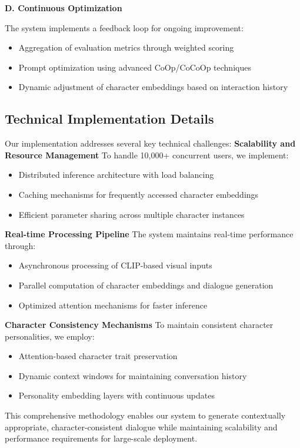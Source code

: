 \documentclass{article}
\begin{document}
\textbf{D. Continuous Optimization}

The system implements a feedback loop for ongoing improvement:
\begin{itemize}
\item Aggregation of evaluation metrics through weighted scoring
\item Prompt optimization using advanced CoOp/CoCoOp techniques
\item Dynamic adjustment of character embeddings based on interaction history
\end{itemize}
\subsection{Technical Implementation Details}
Our implementation addresses several key technical challenges:
\textbf{Scalability and Resource Management}
To handle 10,000+ concurrent users, we implement:
\begin{itemize}
\item Distributed inference architecture with load balancing
\item Caching mechanisms for frequently accessed character embeddings
\item Efficient parameter sharing across multiple character instances
\end{itemize}
\textbf{Real-time Processing Pipeline}
The system maintains real-time performance through:
\begin{itemize}
\item Asynchronous processing of CLIP-based visual inputs
\item Parallel computation of character embeddings and dialogue generation
\item Optimized attention mechanisms for faster inference
\end{itemize}
\textbf{Character Consistency Mechanisms}
To maintain consistent character personalities, we employ:
\begin{itemize}
\item Attention-based character trait preservation
\item Dynamic context windows for maintaining conversation history
\item Personality embedding layers with continuous updates
\end{itemize}
This comprehensive methodology enables our system to generate contextually appropriate, character-consistent dialogue while maintaining scalability and performance requirements for large-scale deployment.
\end{document}

